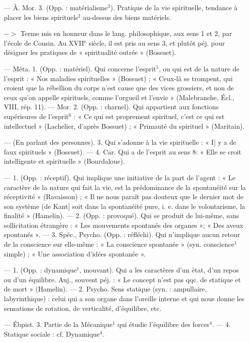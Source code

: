 \begin{itemize}[leftmargin=1cm, label=, itemsep=1pt]
— À. Mor. 3. (Opp. : matérialisme$^3$). Pratique de la vie spirituelle, tendance à placer les biens
spirituels$^2$ au-dessus des biens matériels.

$->$ Terme mis en honneur dans le
lang. philosophique, aux sens 1 et 2,
par l’école de Cousin. Au {\footnotesize XVII}$^\text{e}$ siècle,
il est pris au sens 3, et plutôt péj.
pour désigner les pratiques de « spiritualité outrée » (Bossuet).

 — Méta. 1. (Opp. : matériel).
Qui concerne l'esprit$^5$, ou qui est de
la nature de l'esprit : « Nos maladies
spirituelles » (Bossuet) ; « Ceux-là
se trompent, qui croient que la
rébellion du corps n'est cause que
des vices grossiers, et non de ceux
qu’on appelle spirituels, comme
l’orgueil et l’envie » (Malebranche,
Écl., VIII, rép. 11). — Mor. 2. (Opp. :
charnel). Qui appartient aux fonctions supérieures de l’esprit$^6$ : « Ce
qui est proprement spirituel, c’est
ce qui est intellectuel » (Lachelier,
d’après Bossuet) ; « Primauté du
spirituel » (Maritain).

— (En parlant des personnes).
3. Qui s’adonne à la vie spirituelle :
« I] y a de faux spirituels » (Bossuet).
— 4. Car. Qui a de l'esprit au sens 8:
« Elle se croit intelligente et spirituelle » (Bourdaloue).

 — 1. (Opp. : réceptif). Qui
implique une initiative de la part
de l’agent : « Le caractère de la
nature qui fait la vie, est la prédominance de la spontanéité sur la
réceptivité » (Ravaisson) ; « Il ne
nous paraît pas douteux que le dernier mot de son système (de Kant]
soit dans la spontanéité pure, i. e.
dans le volontarisme, la finalité »
(Hamelin). — 2. (Opp. : provoqué).
Qui se produit de lui-même, sans
sollicitation étrangère : « Les mouvements spontanés des organes »;
« Des aveux spontanés ». — 3. Spéc.,
Psycho. (Opp. : réfléchi). Qui n’implique aucun retour de la conscience
sur elle-même : « La conscience
spontanée » (syn. conscience$^1$
simple) ; « Une association d'idées
spontanée ».

 — 1. (Opp. : dynamique$^1$, mouvant). Qui a les caractères d’un état, d’un repos ou d’un
équilibre. Auj., souvent péj. : « Le
concept n’est pas qqc. de statique
et de mort » (Hamelin). — 2. Psycho.
Sens statique (syn. : ampullaire, labyrinthique) : celui qui a son organe
dans l'oreille interne et qui nous
donne les sensations de rotation,
de verticalité, d'équilibre, etc.

 — Ébpist. 3. Partie
de la Mécanique$^1$ qui étudie l’équilibre des forces$^4$. — 4. Statique sociale : cf. Dynamique$^4$.


\end{itemize}
